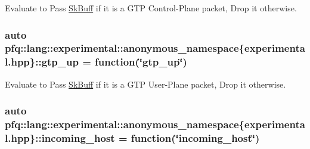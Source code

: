 Evaluate to {\ttfamily Pass} \hyperlink{structpfq_1_1lang_1_1SkBuff}{Sk\+Buff} if it is a G\+TP Control-\/\+Plane packet, {\ttfamily Drop} it otherwise. 

\subsubsection[{\texorpdfstring{gtp\+\_\+up}{gtp_up}}]{\setlength{\rightskip}{0pt plus 5cm}auto pfq\+::lang\+::experimental\+::anonymous\+\_\+namespace\{experimental.\+hpp\}\+::gtp\+\_\+up = {\bf function}(\char`\"{}gtp\+\_\+up\char`\"{})}\hypertarget{namespacepfq_1_1lang_1_1experimental_1_1anonymous__namespace_02experimental_8hpp_03_ac8b95a754c8c3bbef4847904eaf6cb9b}{}\label{namespacepfq_1_1lang_1_1experimental_1_1anonymous__namespace_02experimental_8hpp_03_ac8b95a754c8c3bbef4847904eaf6cb9b}


Evaluate to {\ttfamily Pass} \hyperlink{structpfq_1_1lang_1_1SkBuff}{Sk\+Buff} if it is a G\+TP User-\/\+Plane packet, {\ttfamily Drop} it otherwise. 

\subsubsection[{\texorpdfstring{incoming\+\_\+host}{incoming_host}}]{\setlength{\rightskip}{0pt plus 5cm}auto pfq\+::lang\+::experimental\+::anonymous\+\_\+namespace\{experimental.\+hpp\}\+::incoming\+\_\+host = {\bf function}(\char`\"{}incoming\+\_\+host\char`\"{})}\hypertarget{namespacepfq_1_1lang_1_1experimental_1_1anonymous__namespace_02experimental_8hpp_03_ac6e38127701ae032cf44cb9527131feb}{}\label{namespacepfq_1_1lang_1_1experimental_1_1anonymous__namespace_02experimental_8hpp_03_ac6e38127701ae032cf44cb9527131feb}


